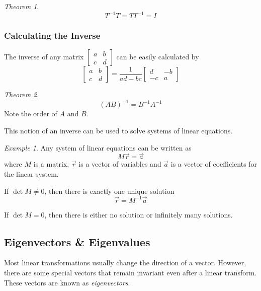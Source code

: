 \documentclass[a4paper]{article}
\theoremstyle{remark}
\newtheorem{example}{Example}
\theoremstyle{theorem}
\newtheorem{theorem}{Theorem}
\begin{document}
\begin{theorem}
	\begin{equation}
		T^{-1}T = TT^{-1} = I
	\end{equation}
\end{theorem}

\subsubsection{Calculating the Inverse}
The inverse of any matrix $\begin{bmatrix} a & b \\ c & d\end{bmatrix}$ can be easily calculated by
\begin{equation}
	\begin{bmatrix} a & b \\ c & d\end{bmatrix}
	=
	\frac{1}{ad-bc}\begin{bmatrix} d & -b \\ -c & a\end{bmatrix}
\end{equation}

\begin{theorem}
	\begin{equation}
		(AB)^{-1} = B^{-1}A^{-1}
	\end{equation}
	Note the order of $A$ and $B$.
\end{theorem}

This notion of an inverse can be used to solve systems of linear equations.

\begin{example}
	Any system of linear equations can be written as
	\begin{equation}
		M\vec{r} = \vec{a}
	\end{equation}
	where $M$ is a matrix, $\vec{r}$ is a vector of variables and $\vec{a}$ is a vector of coefficients for the linear system.
	
	If $\det{M} \neq 0$, then there is exactly one unique solution
	\begin{equation}
		\vec{r} = M^{-1}\vec{a}
	\end{equation}

	If $\det{M} = 0$, then there is either no solution or infinitely many solutions.
\end{example}

\subsection{Eigenvectors \& Eigenvalues}
Most linear transformations usually change the direction of a vector.
However, there are some special vectors that remain invariant even after a linear transform.
These vectors are known as \emph{eigenvectors}.
\end{document}
